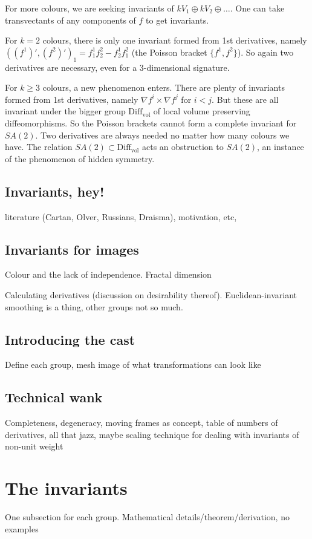 \documentclass{article}
\begin{document}
For more colours,  we are seeking invariants of $k V_1 \oplus k V_2 \oplus \dots$. One can take transvectants of any components of $f$ to get invariants.

For $k=2$ colours, there is only one  invariant formed from 1st derivatives, namely $((f^1)',(f^2)')_1 = f^1_1 f^2_2 - f^1_2 f^2_1$ (the Poisson bracket $\{f^1,f^2\}$). So again two derivatives are necessary, even for 
a 3-dimensional signature.

 For $k\ge 3$ colours, a new phenomenon enters.  There are plenty of invariants
formed from 1st derivatives, namely $\nabla f^i \times \nabla f^j$ for $i<j$. But these are all invariant under the bigger group $\mathrm{Diff}_{\mathrm{vol}}$ of local volume preserving diffeomorphisms. So the Poisson brackets
cannot form a complete invariant for $SA(2)$. Two derivatives are always needed no matter how many
colours we have. The relation $SA(2)\subset \mathrm{Diff}_{\mathrm{vol}}$ acts an obstruction
to $SA(2)$, an instance of the phenomenon of hidden symmetry.


\subsection{Invariants, hey!}
literature (Cartan, Olver, Russians, Draisma), motivation, etc,

\subsection{Invariants for images}
Colour and the lack of independence. Fractal dimension 

Calculating derivatives (discussion on desirability thereof).
Euclidean-invariant smoothing is a thing, other groups not so much.

\subsection{Introducing the cast}
Define each group, mesh image of what transformations can look like

\subsection{Technical wank}
Completeness, degeneracy, moving frames as concept, table of numbers of
derivatives, all that jazz, maybe scaling technique
for dealing with invariants of non-unit weight


\section{The invariants}
One subsection for each group. Mathematical details/theorem/derivation, no
examples
\end{document}
